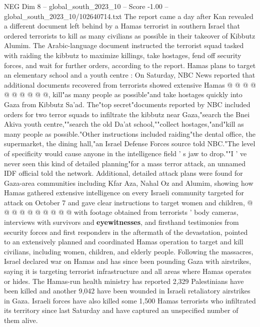 \begin{textsample}{NEG Dim 8 – global\_south\_2023\_10 – Score -1.00 – global\_south\_2023\_10/102640714.txt}
The report came a day after Kan revealed a different document left behind by a Hamas terrorist in southern Israel that ordered terrorists to kill as many civilians as possible in their takeover of Kibbutz Alumim.
The Arabic-language document instructed the terrorist squad tasked with raiding the kibbutz to maximize killings, take hostages, fend off security forces, and wait for further orders, according to the report.
Hamas plans to target an elementary school and a youth centre : On Saturday, NBC News reported that additional documents recovered from terrorists showed extensive Hamas @ @ @ @ @ @ @ @ @ @, kill"as many people as possible"and take hostages quickly into Gaza from Kibbutz Sa'ad.
The"top secret"documents reported by NBC included orders for two terror squads to infiltrate the kibbutz near Gaza,"search the Bnei Akiva youth centre,""search the old Da'at school,""collect hostages,"and"kill as many people as possible."Other instructions included raiding"the dental office, the supermarket, the dining hall,"an Israel Defense Forces source told NBC."The level of specificity would cause anyone in the intelligence field ' s jaw to drop.""I ' ve never seen this kind of detailed planning"for a mass terror attack, an unnamed IDF official told the network.
Additional, detailed attack plans were found for Gaza-area communities including Kfar Aza, Nahal Oz and Alumim, showing how Hamas gathered extensive intelligence on every Israeli community targeted for attack on October 7 and gave clear instructions to target women and children, @ @ @ @ @ @ @ @ @ @ with footage obtained from terrorists ' body cameras, interviews with survivors and \textbf{eyewitnesses}, and firsthand testimonies from security forces and first responders in the aftermath of the devastation, pointed to an extensively planned and coordinated Hamas operation to target and kill civilians, including women, children, and elderly people.
Following the massacres, Israel declared war on Hamas and has since been pounding Gaza with airstrikes, saying it is targeting terrorist infrastructure and all areas where Hamas operates or hides.
The Hamas-run health ministry has reported 2,329 Palestinians have been killed and another 9,042 have been wounded in Israeli retaliatory airstrikes in Gaza.
Israeli forces have also killed some 1,500 Hamas terrorists who infiltrated its territory since last Saturday and have captured an unspecified number of them alive.

\end{textsample}
